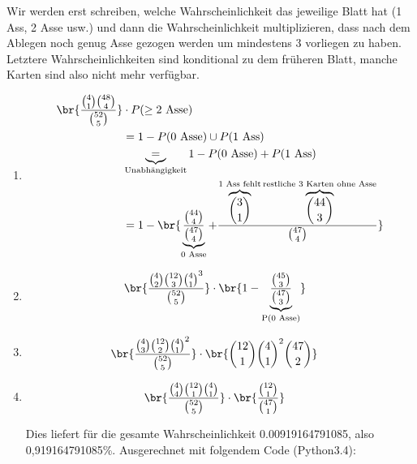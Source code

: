 \begin{enumerate}[a)]
  Wir werden erst schreiben, welche Wahrscheinlichkeit das jeweilige Blatt hat (1 Ass, 2 Asse usw.) und dann die Wahrscheinlichkeit multiplizieren, dass nach dem Ablegen noch genug Asse gezogen werden um mindestens 3 vorliegen zu haben. Letztere Wahrscheinlichkeiten sind konditional zu dem früheren Blatt, manche Karten sind also nicht mehr verfügbar.

  \begin{enumerate}
    \item
      \begin{align*}
        \br{\frac{\binom{4}{1} \binom{48}{4} }{ \binom{52}{5} }} &\cdot P(\geq \text{2 Asse}) \\
                                    &= 1 - P(\text{0 Asse}) \cup P(\text{1 Ass})\\
                                    &\underbrace{=}_{\text{Unabhängigkeit}} 1 - P(\text{0 Asse}) + P(\text{1 Ass})\\
                                    &= 1- \br{ \underbrace{\frac{\binom{44}{4}}{\binom{47}{4}}}_{\text{0 Asse}} +
                                        \frac{ \overbrace{\binom{3}{1}}^{\text{1 Ass fehlt}} \overbrace{\binom{44}{3}}^{\text{restliche 3 Karten ohne Asse}}}{ \binom{47}{4} } }\\
      \end{align*}
    \item
      \begin{align*}
        \br{ \frac{ \binom{4}{2} \binom{12}{3} \binom{4}{1}^{3} }{ \binom{52}{5} }  }
                &\cdot \br{ 1 - \underbrace{\frac{ \binom{45}{3} }{\binom{47}{3} }}_{\text{P(0 Asse)}} }
      \end{align*}

    \item
      \begin{align*}
        \br{ \frac{ \binom{4}{3} \binom{12}{2} \binom{4}{1}^{2} }{\binom{52}{5}} }
          &\cdot \br{ \binom{12}{1} \binom{4}{1}^{2}{\binom{47}{2}} }
      \end{align*}
    \item
      \begin{align*}
        \br{ \frac{ \binom{4}{4} \binom{12}{1} \binom{4}{1} }{\binom{52}{5}} }
            &\cdot \br{\frac{\binom{12}{1}}{\binom{47}{1}}}
      \end{align*}

    Dies liefert für die gesamte Wahrscheinlichkeit 0.00919164791085, also 0,919164791085\%.
    Ausgerechnet mit folgendem Code (Python3.4):


\end{enumerate}
\end{enumerate}
